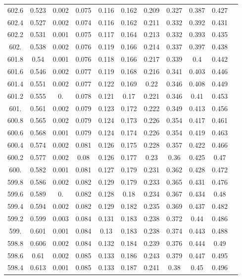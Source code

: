 \documentclass[12pt]{ctexart}
\numberwithin{equation}{section}
\begin{document}
\begin{longtable}{ccccccccccc}
602.6	&	0.523	&	0.002	&	0.075	&	0.116	&	0.162	&	0.209	&	0.327	&	0.387	&	0.427	\\
602.4	&	0.527	&	0.002	&	0.074	&	0.116	&	0.162	&	0.211	&	0.332	&	0.392	&	0.431	\\
602.2	&	0.531	&	0.001	&	0.075	&	0.117	&	0.164	&	0.213	&	0.332	&	0.393	&	0.435	\\
602.	&	0.538	&	0.002	&	0.076	&	0.119	&	0.166	&	0.214	&	0.337	&	0.397	&	0.438	\\
601.8	&	0.54	&	0.001	&	0.076	&	0.118	&	0.166	&	0.217	&	0.339	&	0.4	&	0.442	\\
601.6	&	0.546	&	0.002	&	0.077	&	0.119	&	0.168	&	0.216	&	0.341	&	0.403	&	0.446	\\
601.4	&	0.551	&	0.002	&	0.077	&	0.122	&	0.169	&	0.22	&	0.346	&	0.408	&	0.449	\\
601.2	&	0.555	&	0.	&	0.078	&	0.121	&	0.17	&	0.221	&	0.346	&	0.41	&	0.453	\\
601.	&	0.561	&	0.002	&	0.079	&	0.123	&	0.172	&	0.222	&	0.349	&	0.413	&	0.456	\\
600.8	&	0.565	&	0.002	&	0.079	&	0.124	&	0.173	&	0.226	&	0.354	&	0.417	&	0.461	\\
600.6	&	0.568	&	0.001	&	0.079	&	0.124	&	0.174	&	0.226	&	0.354	&	0.419	&	0.463	\\
600.4	&	0.574	&	0.002	&	0.081	&	0.126	&	0.175	&	0.228	&	0.357	&	0.422	&	0.466	\\
600.2	&	0.577	&	0.002	&	0.08	&	0.126	&	0.177	&	0.23	&	0.36	&	0.425	&	0.47	\\
600.	&	0.582	&	0.001	&	0.081	&	0.127	&	0.179	&	0.231	&	0.362	&	0.428	&	0.472	\\
599.8	&	0.586	&	0.002	&	0.082	&	0.129	&	0.179	&	0.233	&	0.365	&	0.431	&	0.476	\\
599.6	&	0.589	&	0.	&	0.082	&	0.128	&	0.18	&	0.234	&	0.367	&	0.434	&	0.48	\\
599.4	&	0.594	&	0.002	&	0.082	&	0.129	&	0.182	&	0.235	&	0.369	&	0.437	&	0.482	\\
599.2	&	0.599	&	0.003	&	0.084	&	0.131	&	0.183	&	0.238	&	0.372	&	0.44	&	0.486	\\
599.	&	0.601	&	0.001	&	0.084	&	0.13	&	0.183	&	0.238	&	0.374	&	0.443	&	0.488	\\
598.8	&	0.606	&	0.002	&	0.084	&	0.132	&	0.184	&	0.239	&	0.376	&	0.444	&	0.49	\\
598.6	&	0.61	&	0.002	&	0.085	&	0.133	&	0.186	&	0.243	&	0.379	&	0.447	&	0.495	\\
598.4	&	0.613	&	0.001	&	0.085	&	0.133	&	0.187	&	0.241	&	0.38	&	0.45	&	0.496	\\

\end{longtable}
\end{document}
